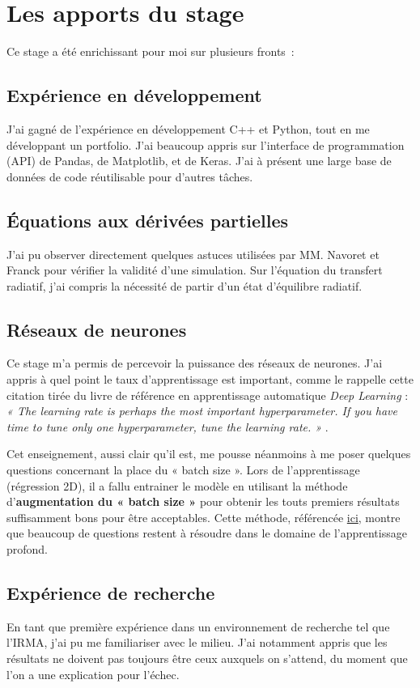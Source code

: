 
\section{Les apports du stage}

Ce stage a été enrichissant pour moi sur plusieurs fronts :

\subsection{Expérience en développement}
J'ai gagné de l'expérience en développement C++ et Python, tout en me développant un portfolio. J'ai beaucoup appris sur l'interface de programmation (API) de Pandas, de Matplotlib, et de Keras. J'ai à présent une large base de données de code réutilisable pour d'autres tâches.

\subsection{Équations aux dérivées partielles}
J'ai pu observer directement quelques astuces utilisées par MM. Navoret et Franck pour vérifier la validité d'une simulation. Sur l'équation du transfert radiatif, j'ai compris la nécessité de partir d'un état d'équilibre radiatif.

\subsection{Réseaux de neurones}
Ce stage m'a permis de percevoir la puissance des réseaux de neurones. J'ai appris à quel point le taux d'apprentissage est important, comme le rappelle cette citation tirée du livre de référence en apprentissage automatique \emph{Deep Learning} : \textit{« The learning rate is perhaps the most important hyperparameter. If you have time to tune only one hyperparameter, tune the learning rate. »} \parencite[417]{Reference5}. 

Cet enseignement, aussi clair qu'il est, me pousse néanmoins à me poser quelques questions concernant la place du « batch size ». Lors de l'apprentissage (régression 2D), il a fallu entrainer le modèle en utilisant la méthode d'\textbf{augmentation du « batch size »} pour obtenir les touts premiers résultats suffisamment bons pour être acceptables. Cette méthode, référencée \href{https://arxiv.org/pdf/1711.00489.pdf}{ici}, montre que beaucoup de questions restent à résoudre dans le domaine de l'apprentissage profond.

\subsection{Expérience de recherche}
En tant que première expérience dans un environnement de recherche tel que l'IRMA, j'ai pu me familiariser avec le milieu. J'ai notamment appris que les résultats ne doivent pas toujours être ceux auxquels on s'attend, du moment que l'on a une explication pour l'échec.

